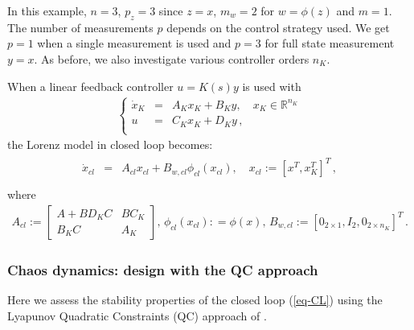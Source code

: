 \documentclass[12pt, a4paper,reqno]{amsart}
\theoremstyle{definition}
\begin{document}
In this example,  $n = 3$, $p_z = 3$ since $z = x$, $m_w = 2$ for $w = \phi(z)$  and $m=1$. The number of measurements $p$ depends on the control strategy used. We get $p =1$ when a single measurement is used and $p=3$ for full state measurement $y=x$. As before, we also investigate various controller orders $n_K$. 


When a linear feedback controller $u = K(s) y$ is used with
\begin{eqnarray}
\label{eq-K}
 \left\{   \begin{array}{lll}
\dot x_K \!\!&\!\!=&\!\! A_K x_K + B_K y, \quad x_K \in \mathbb R^{n_K} \\
 u \!\!&\!\! = &\!\! C_K x_K + D_K y\,, \\
    \end{array} \right.
\end{eqnarray}
%
the Lorenz model in closed loop becomes: 
\begin{eqnarray}
\label{eq-CL}
\begin{array}{lll}
\dot x_{cl} &=& A_{cl}  x_{cl} +  B_{w,cl} \phi_{cl}(x_{cl}),\quad  x_{cl}:= [x^T, x_K^T]^T\,, \\
    \end{array}
\end{eqnarray}
where  
\begin{eqnarray} 
\label{eq-CLlorenz}
A_{cl} := \begin{bmatrix} A+B D_K C & B C_K \\ B_K C & A_K  \end{bmatrix}, \, 
\phi_{cl}(x_{cl}): = \phi(x), \, B_{w,cl}:=[0_{2\times 1},I_2,0_{2 \times n_K}]^T \,.\end{eqnarray}
%



\subsubsection{Chaos dynamics: design with the QC approach \label{sect-QC1}}
Here we
assess the stability properties of the closed loop (\ref{eq-CL}) using the Lyapunov Quadratic Constraints (QC) approach 
of \cite{mushtaq2022feedback,kalur2021nonlinear,liu2020input}.  
\end{document}

